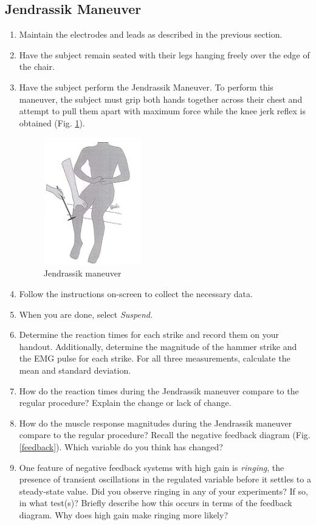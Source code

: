 \documentclass{article}
\begin{document}
\subsection*{Jendrassik Maneuver}
\begin{enumerate}
	\item Maintain the electrodes and leads as described in the previous section.
	\item Have the subject remain seated with their legs hanging freely over the edge of the chair.
	\item Have the subject perform the Jendrassik Maneuver. To perform this maneuver, the subject must grip both hands together across their chest and attempt to pull them apart with maximum force while the knee jerk reflex is obtained (Fig. \ref{jendrassik}).
	
		\begin{figure}[h]
		\centering
		\includegraphics[width=0.4\textwidth]{../images/EMG_II_8.jpg}	
		\caption{Jendrassik maneuver}
		\label{jendrassik}
		\end{figure}

	\item Follow the instructions on-screen to collect the necessary data.
	\item When you are done, select \textit{Suspend.}
	\item Determine the reaction times for each strike and record them on your handout. Additionally, determine the magnitude of the hammer strike and the EMG pulse for each strike. For all three measurements, calculate the mean and standard deviation.
	\item How do the reaction times during the Jendrassik maneuver compare to the regular procedure? Explain the change or lack of change.
	\item How do the muscle response magnitudes during the Jendrassik maneuver compare to the regular procedure? Recall the negative feedback diagram (Fig. \ref{feedback}). Which variable do you think has changed?
	\item One feature of negative feedback systems with high gain is \textit{ringing}, the presence of transient oscillations in the regulated variable before it settles to a steady-state value. Did you observe ringing in any of your experiments? If so, in what test(s)? Briefly describe how this occurs in terms of the feedback diagram. Why does high gain make ringing more likely?
\end{enumerate}
\end{document}
